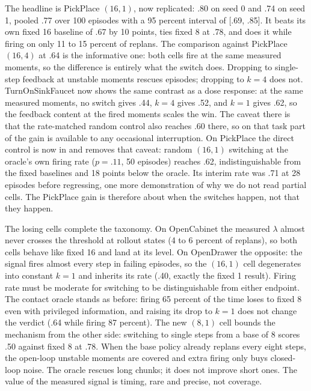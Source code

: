 \documentclass[11pt]{article}
\begin{document}
The headline is PickPlace $(16,1)$, now replicated: .80 on seed 0 and .74
on seed 1, pooled .77 over 100 episodes with a 95 percent interval of
[.69, .85]. It beats its own fixed 16 baseline of .67 by 10 points, ties
fixed 8 at .78, and does it while firing on only 11 to 15 percent of
replans. The comparison against PickPlace $(16,4)$ at .64 is the
informative one: both cells fire at the same measured moments, so the
difference is entirely what the switch does. Dropping to single-step
feedback at unstable moments rescues episodes; dropping to $k{=}4$ does
not. TurnOnSinkFaucet now shows the same contrast as a dose response: at
the same measured moments, no switch gives .44, $k{=}4$ gives .52, and
$k{=}1$ gives .62, so the feedback content at the fired moments scales the
win. The caveat there is that the rate-matched random
control also reaches .60 there, so on that task part of the gain is
available to any occasional interruption. On PickPlace the direct control
is now in and removes that caveat: random $(16,1)$ switching at the
oracle's own firing rate ($p{=}.11$, 50 episodes) reaches .62,
indistinguishable from the fixed baselines and 18 points below the oracle.
Its interim rate was .71 at 28 episodes before regressing, one more
demonstration of why we do not read partial cells. The PickPlace gain is
therefore about when the switches happen, not that they happen.

The losing cells complete the taxonomy. On OpenCabinet the measured
$\lambda$ almost never crosses the threshold at rollout states (4 to 6
percent of replans), so both cells behave like fixed 16 and land at its
level. On OpenDrawer the opposite: the signal fires almost every step in
failing episodes, so the $(16,1)$ cell degenerates into constant $k{=}1$
and inherits its rate (.40, exactly the fixed 1 result). Firing rate must
be moderate for switching to be distinguishable from either endpoint. The
contact oracle stands as before: firing 65 percent of the time loses to
fixed 8 even with privileged information, and raising its drop to $k{=}1$
does not change the verdict (.64 while firing 87 percent). The new
$(8,1)$ cell bounds the mechanism from the other side: switching to single
steps from a base of 8 scores .50 against fixed 8 at .78. When the base
policy already replans every eight steps, the open-loop unstable moments
are covered and extra firing only buys closed-loop noise. The oracle
rescues long chunks; it does not improve short ones. The value of the
measured signal is timing, rare and precise, not coverage.
\end{document}
